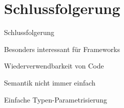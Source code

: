 \section{Schlussfolgerung}
\begin{frame}[t]{Schlussfolgerung}
	\begin{bigitemize}[<+->]{3mm}
		\item Besonders interessant für Frameworks

		\item Wiederverwendbarkeit von Code

		\item Semantik nicht immer einfach

		\item Einfache Typen-Parametrisierung
	\end{bigitemize}
\end{frame}

